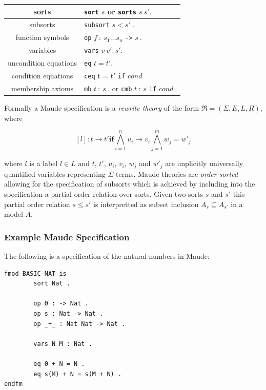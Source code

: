 \medskip
\begin{center}
\begin{tabular}{| c | l |}
\hline
sorts    & \texttt{sort} $s$ or \texttt{sorts}  $s \ s' .$ \\ \hline
subsorts  & \texttt{subsort} $s < s' \ .$ \\ \hline
function symbols  & \texttt{op} $f \ :  \ s_1 \ldots s_n$ \texttt{->} $s \ .$ \\ \hline
variables  & \texttt{vars} $v \ v' : s' .$\\ \hline
uncondition equations  &\texttt{eq} $t = t' .$\\ \hline
condition equations & \texttt{ceq} t = t' \texttt{if} $cond$ \\ \hline
membership axioms & \texttt{mb} $t \ : \ s \ .$ or \texttt{cmb} $t  \ : \ s$ \texttt{if} $cond \ .$  \\ \hline
\end{tabular}
\end{center}


Formally a Maude specification is a \emph{rewrite theory} of the form $\mathfrak{R}=(\Sigma,E,L,R)$, where 

$$ [l] : t \to t' \mathbf{if} \bigwedge^{n}_{i = 1} u_i \to v_i \bigwedge^{m}_{j = 1} w_j = w'_j $$

where $l$ is a label $l \in L$ and $t$, $t'$, $u_i$, $v_i$, $w_j$ and $w'_j$ are implicitly universally quantified variables representing $\Sigma$-terms. Maude theories are \emph{order-sorted} allowing for the specification of subsorts which is achieved by including into the specification a partial order relation over sorts. Given two sorts $s$ and $s'$ this partial order relation $s \leq s'$ is interpretted as subset inclusion $A_s \subseteq A_{s'}$ in a model $A$.


\begin{mydef}


\end{mydef}

\subsubsection{Example Maude Specification}
The following is a specification of the natural numbers in Maude:

\begin{verbatim}
fmod BASIC-NAT is
        sort Nat .

        op 0 : -> Nat .
        op s : Nat -> Nat .
        op _+_ : Nat Nat -> Nat .

        vars N M : Nat .

        eq 0 + N = N .
        eq s(M) + N = s(M + N) .
endfm
\end{verbatim}



